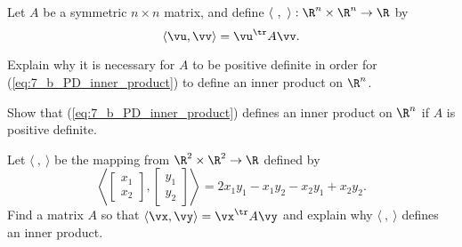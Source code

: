 \begin{activity} Let $A$ be a symmetric $n \times n$ matrix, and define $\langle \ , \ \rangle : \R^n \times \R^n \to \R$ by
    \begin{equation} \label{eq:7_b_PD_inner_product}
    \langle \vu, \vv \rangle = \vu^{\tr}A\vv.
    \end{equation}
    \ba
    \item Explain why it is necessary for $A$ to be positive definite in order for (\ref{eq:7_b_PD_inner_product}) to define an inner product on $\R^n$.

    \item Show that (\ref{eq:7_b_PD_inner_product}) defines an inner product on $\R^n$ if $A$ is positive definite.

	\item Let $\langle \ , \ \rangle$ be the mapping from $\R^2\times \R^2\to \R$ defined by
\[\left\langle \left[ \begin{array}{c} x_1 \\ x_2 \end{array} \right], \left[ \begin{array}{c} y_1 \\ y_2 \end{array} \right] \right\rangle = 2x_1y_1 - x_1y_2 - x_2y_1 + x_2y_2.\]
Find a matrix $A$ so that $\langle \vx, \vy \rangle = \vx^{\tr} A \vy$ and explain why $\langle \ , \ \rangle$ defines an inner product. 

    \ea

\end{activity}


\ExampleIntro

